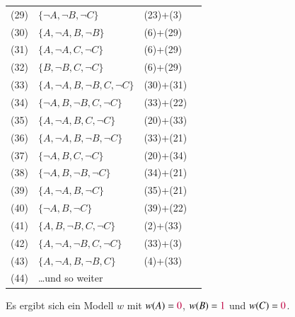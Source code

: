 \documentclass[aspectratio=1610,onlymath]{beamer}
\begin{document}
\begin{frame}
\begin{minipage}{5cm}
{\begin{tabular}[t]{rlll}
%
(29) & $\{\neg A,\neg B,\neg C\}$ & (23)+(3)\\
(30) & $\{A,\neg A,B,\neg B\}$ & (6)+(29)\\
(31) & $\{A,\neg A,C,\neg C\}$ & (6)+(29)\\
(32) & $\{B,\neg B,C,\neg C\}$ & (6)+(29)\\
%
(33) & $\{A,\neg A, B,\neg B,C,\neg C\}$ & (30)+(31)\\
(34) & $\{\neg A, B,\neg B,C,\neg C\}$ & (33)+(22)\\
(35) & $\{A, \neg A, B,C,\neg C\}$ & (20)+(33)\\
(36) & $\{A, \neg A, B,\neg B,\neg C\}$ & (33)+(21)\\
(37) & $\{\neg A, B,C,\neg C\}$ & (20)+(34)\\
(38) & $\{\neg A, B,\neg B,\neg C\}$ & (34)+(21)\\
(39) & $\{A, \neg A, B,\neg C\}$ & (35)+(21)\\
(40) & $\{\neg A, B,\neg C\}$ & (39)+(22)\\
(41) & $\{A, B,\neg B,C,\neg C\}$ & (2)+(33)\\
(42) & $\{A,\neg A, \neg B,C,\neg C\}$ & (33)+(3)\\
(43) & $\{A,\neg A, B,\neg B,C\}$ & (4)+(33)\\
(44) & \ldots und so weiter
\end{tabular}}\pause
\vspace{5mm}

Es ergibt sich ein Modell $w$ mit
$w(A)=\textcolor{purple}{0}$, $w(B)=\textcolor{purple}{1}$ und $w(C)=\textcolor{purple}{0}$.
\end{minipage}

\end{frame}
\end{document}
